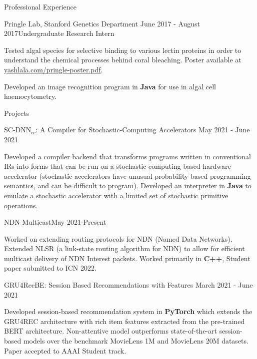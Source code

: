 \documentclass{resume} %
\begin{document}
\begin{resumeSection}{Professional Experience}
\begin{resumeSubsection}{Pringle Lab, Stanford Genetics Department}
	{June 2017 - August 2017}{Undergraduate Research Intern}{}
\item Tested algal species for selective binding to various lectin proteins in
	order to understand the chemical processes behind coral bleaching.
	Poster available at
	\href{https://yashlala.com/pringle-poster.pdf}{yashlala.com/pringle-poster.pdf}. 
\item Developed an image recognition program in \textbf{Java} for use in
	algal cell haemocytometry.
\end{resumeSubsection}

\end{resumeSection}


\begin{resumeSection}{Projects} \itemsep -10pt

\begin{resumeSubsection}
	{$\text{SC-DNN}_{cc}$: A Compiler for Stochastic-Computing Accelerators}
	{May 2021 - June 2021}{}{}
\item Developed a compiler backend that transforms programs written in
	conventional IRs into forms that can be run on a stochastic-computing
	based hardware accelerator (stochastic accelerators have unusual
	probability-based programming semantics, and can be difficult to
	program). Developed an interpreter in \textbf{Java} to emulate a
	stochastic accelerator with a limited set of stochastic primitive
	operations. 
\end{resumeSubsection}

\begin{resumeSubsection}{NDN Multicast}{May 2021-Present}{}{}
\item Worked on extending routing protocols for NDN (Named Data Networks). 
	Extended NLSR (a link-state routing algorithm for NDN) to allow for
	efficient multicast delivery of NDN Interest packets. Worked primarily
	in \textbf{C++}, Student paper submitted to ICN 2022. 
\end{resumeSubsection}

\begin{resumeSubsection}{GRU4RecBE: Session Based Recommendations with Features}
	{March 2021 - June 2021}{}{}
\item Developed session-based recommendation system in \textbf{PyTorch} which
	extends the GRU4REC architecture with rich item features extracted from
	the pre-trained BERT architecture. Non-attentive model outperforms
	state-of-the-art session-based models over the benchmark MovieLens 1M
	and MovieLens 20M datasets. Paper accepted to AAAI Student track. 
\end{resumeSubsection}


\end{resumeSection}
\end{document}
